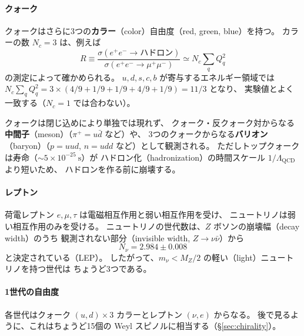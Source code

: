 \documentclass[uplatex,dvipdfmx,a4paper,11pt,openany]{jsbook}
\newcommand{\term}[2]{\textbf{#1}（#2）}
\newcommand{\en}[1]{（#1）}
\numberwithin{equation}{chapter}
\theoremstyle{definition}
\theoremstyle{plain}
\theoremstyle{remark}
\begin{document}
\paragraph{クォーク}
クォークはさらに3つの\term{カラー}{color}自由度（red, green, blue）を持つ。
カラーの数 $N_c=3$ は、例えば
\begin{equation}
R\equiv\frac{\sigma(e^+e^-\to\text{ハドロン})}{\sigma(e^+e^-\to\mu^+\mu^-)}
\simeq N_c\sum_qQ_q^2
\end{equation}
の測定によって確かめられる。
$u,d,s,c,b$ が寄与するエネルギー領域では
$N_c\sum_qQ_q^2=3\times(4/9+1/9+1/9+4/9+1/9)=11/3$ となり、
実験値とよく一致する（$N_c=1$ では合わない）。

クォークは閉じ込めにより単独では現れず、
クォーク・反クォーク対からなる\term{中間子}{meson}（$\pi^+=u\bar d$ など）や、
3つのクォークからなる\term{バリオン}{baryon}（$p=uud$, $n=udd$ など）として観測される。
ただしトップクォークは寿命（$\sim5\times10^{-25}\ \mathrm{s}$）が
ハドロン化\en{hadronization}の時間スケール $1/\Lambda_{\mathrm{QCD}}$ より短いため、
ハドロンを作る前に崩壊する。
\paragraph{レプトン}
荷電レプトン $e,\mu,\tau$ は電磁相互作用と弱い相互作用を受け、
ニュートリノは弱い相互作用のみを受ける。
ニュートリノの世代数は、$Z$ ボソンの崩壊幅\en{decay width}のうち
観測されない部分（invisible width, $Z\to\nu\bar\nu$）から
\begin{equation}
N_\nu=2.984\pm0.008
\end{equation}
と決定されている（LEP）。
したがって、$m_\nu<M_Z/2$ の軽い\en{light}ニュートリノを持つ世代は
ちょうど3つである。
\paragraph{1世代の自由度}
各世代はクォーク $(u,d)\times3$ カラーとレプトン $(\nu,e)$ からなる。
後で見るように、これはちょうど15個の Weyl スピノルに相当する（\S\ref{sec:chirality}）。
\end{document}
